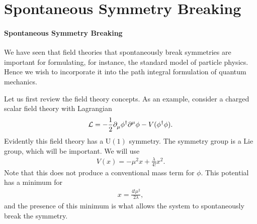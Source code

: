\section{Spontaneous Symmetry Breaking}

\paragraph{Spontaneous Symmetry Breaking}
We have seen that field theories that spontaneously break symmetries are important for formulating, for instance, the standard model of particle physics. Hence we wish to incorporate it into the path integral formulation of quantum mechanics.

Let us first review the field theory concepts. As an example, consider a charged scalar field theory with Lagrangian
\begin{align*}
\mathcal{L} = -\frac{1}{2}\partial^{}_{\mu}\phi^{\dagger}\partial^{\mu}_{}\phi - V(\phi^{\dagger}\phi).
\end{align*}
Evidently this field theory has a $\text{U}(1)$ symmetry. The symmetry group is a Lie group, which will be important. We will use
\begin{align*}
V(x) = -\mu^{2}x + \frac{\lambda}{4!}x^{2}.
\end{align*}
Note that this does not produce a conventional mass term for $\phi$. This potential has a minimum for
\begin{align*}
x = \frac{4!\mu^{2}}{2\lambda},
\end{align*}
and the presence of this minimum is what allows the system to spontaneously break the symmetry.

